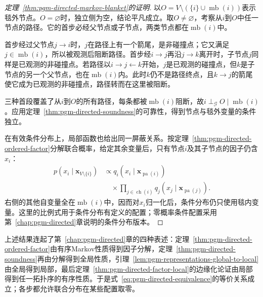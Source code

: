 \begin{proof}[定理~\ref{thm:pgm-directed-markov-blanket}的证明]
以$O=V\setminus(\{i\}\cup\operatorname{mb}(i))$表示毯外节点。$O=\varnothing$时，独立侧为空，结论平凡成立。取$O\neq\varnothing$，考察从$i$到$O$中任一节点的路径。它的首步必经父节点或子节点，两类节点都在$\operatorname{mb}(i)$中。

首步经过父节点$j\to i$时，$j$在路径上有一个箭尾，是非碰撞点；它又满足$j\in\operatorname{mb}(i)$，所以被观测后阻断路径。首步经$i\to j$再沿$j\to k$离开时，子节点$j$同样是已观测的非碰撞点。若路径以$i\to j\leftarrow k$开始，$j$是已观测的碰撞点，但$k$是子节点的另一个父节点，也在$\operatorname{mb}(i)$内。此时$k$仍不是路径终点，且$k\to j$的箭尾使它成为已观测的非碰撞点，路径转而在这里被阻断。

三种首段覆盖了从$i$到$O$的所有路径，每条都被$\operatorname{mb}(i)$阻断，故$i\perp_{\mathcal G}O\mid\operatorname{mb}(i)$。应用定理~\ref{thm:pgm-directed-soundness}的可靠性，得到节点与毯外变量的条件独立。

在有效条件分布上，局部函数也给出同一屏蔽关系。按定理~\ref{thm:pgm-directed-ordered-factor}分解联合概率，给定其余变量后，只有节点$i$及其子节点的因子仍含$x_i$：
\begin{equation}
  \begin{aligned}
    p(x_i\mid\bm{x}_{V\setminus\{i\}})
      &\propto q_i(x_i\mid\bm{x}_{\operatorname{pa}(i)})\\
      &\quad{}\times
      \prod_{j\in\operatorname{ch}(i)}
        q_j(x_j\mid\bm{x}_{\operatorname{pa}(j)}).
  \end{aligned}
  \label{eq:pgm-directed-blanket-conditional}
\end{equation}
右侧的其他自变量全在$\operatorname{mb}(i)$中，因而对$x_i$归一化后，条件分布仍只使用毯内变量。这里的比例式用于条件分布有定义的配置；零概率条件配置采用第~\ref{chap:pgm-directed}章说明的条件分布版本。
\end{proof}

上述结果连起了第~\ref{chap:pgm-directed}章的四种表述：定理~\ref{thm:pgm-directed-ordered-factor}由有序Markov性质得到因子分解，定理~\ref{thm:pgm-directed-soundness}再由分解得到全局性质，引理~\ref{lem:pgm-representations-global-to-local}由全局得到局部，最后定理~\ref{thm:pgm-directed-factor-local}的边缘化论证由局部得到任一拓扑序的有序性质。于是式~\eqref{eq:pgm-directed-equivalence}的等价关系成立；各步都允许联合分布在某些配置取零。

